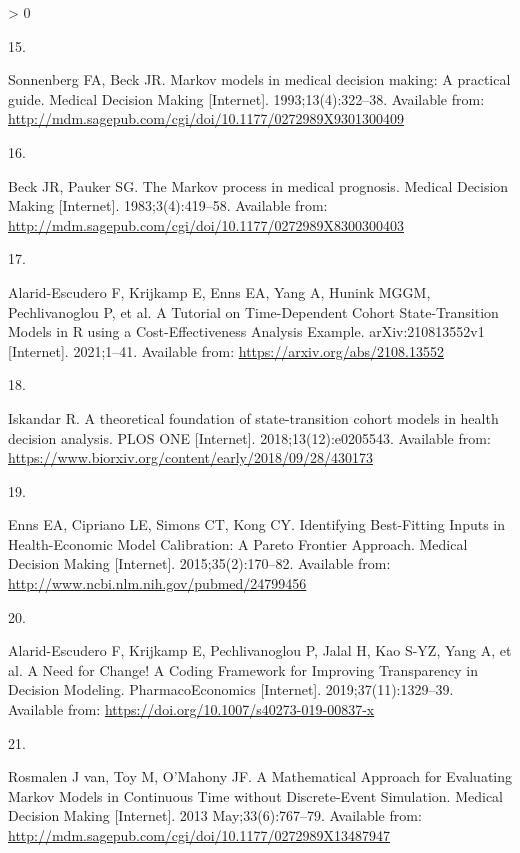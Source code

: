 \documentclass[
]{article}
\newlength{\cslhangindent}
\newlength{\csllabelwidth}
\newenvironment{CSLReferences}[2] %
 {%
  \setlength{\parindent}{0pt}
  \ifodd #1 \everypar{\setlength{\hangindent}{\cslhangindent}}\ignorespaces\fi
  \ifnum #2 > 0
  \setlength{\parskip}{#2\baselineskip}
  \fi
 }%
 {}
\newcommand{\CSLLeftMargin}[1]{\parbox[t]{\csllabelwidth}{#1}}
\newcommand{\CSLRightInline}[1]{\parbox[t]{\linewidth - \csllabelwidth}{#1}\break}
\begin{document}
\begin{CSLReferences}{0}{0}
\leavevmode\hypertarget{ref-Sonnenberg1993}{}%
\CSLLeftMargin{15. }
\CSLRightInline{Sonnenberg FA, Beck JR. {Markov models in medical decision making: A practical guide}. Medical Decision Making {[}Internet{]}. 1993;13(4):322--38. Available from: \url{http://mdm.sagepub.com/cgi/doi/10.1177/0272989X9301300409}}

\leavevmode\hypertarget{ref-Beck1983}{}%
\CSLLeftMargin{16. }
\CSLRightInline{Beck JR, Pauker SG. {The Markov process in medical prognosis}. Medical Decision Making {[}Internet{]}. 1983;3(4):419--58. Available from: \url{http://mdm.sagepub.com/cgi/doi/10.1177/0272989X8300300403}}

\leavevmode\hypertarget{ref-Alarid-Escudero2021b}{}%
\CSLLeftMargin{17. }
\CSLRightInline{Alarid-Escudero F, Krijkamp E, Enns EA, Yang A, Hunink MGGM, Pechlivanoglou P, et al. {A Tutorial on Time-Dependent Cohort State-Transition Models in R using a Cost-Effectiveness Analysis Example}. arXiv:210813552v1 {[}Internet{]}. 2021;1--41. Available from: \url{https://arxiv.org/abs/2108.13552}}

\leavevmode\hypertarget{ref-Iskandar2018a}{}%
\CSLLeftMargin{18. }
\CSLRightInline{Iskandar R. {A theoretical foundation of state-transition cohort models in health decision analysis}. PLOS ONE {[}Internet{]}. 2018;13(12):e0205543. Available from: \url{https://www.biorxiv.org/content/early/2018/09/28/430173}}

\leavevmode\hypertarget{ref-Enns2015e}{}%
\CSLLeftMargin{19. }
\CSLRightInline{Enns EA, Cipriano LE, Simons CT, Kong CY. {Identifying Best-Fitting Inputs in Health-Economic Model Calibration: A Pareto Frontier Approach}. Medical Decision Making {[}Internet{]}. 2015;35(2):170--82. Available from: \url{http://www.ncbi.nlm.nih.gov/pubmed/24799456}}

\leavevmode\hypertarget{ref-Alarid-Escudero2019e}{}%
\CSLLeftMargin{20. }
\CSLRightInline{Alarid-Escudero F, Krijkamp E, Pechlivanoglou P, Jalal H, Kao S-YZ, Yang A, et al. {A Need for Change! A Coding Framework for Improving Transparency in Decision Modeling}. PharmacoEconomics {[}Internet{]}. 2019;37(11):1329--39. Available from: \url{https://doi.org/10.1007/s40273-019-00837-x}}

\leavevmode\hypertarget{ref-VanRosmalen2013}{}%
\CSLLeftMargin{21. }
\CSLRightInline{Rosmalen J van, Toy M, O'Mahony JF. {A Mathematical Approach for Evaluating Markov Models in Continuous Time without Discrete-Event Simulation}. Medical Decision Making {[}Internet{]}. 2013 May;33(6):767--79. Available from: \url{http://mdm.sagepub.com/cgi/doi/10.1177/0272989X13487947}}


\end{CSLReferences}
\end{document}
